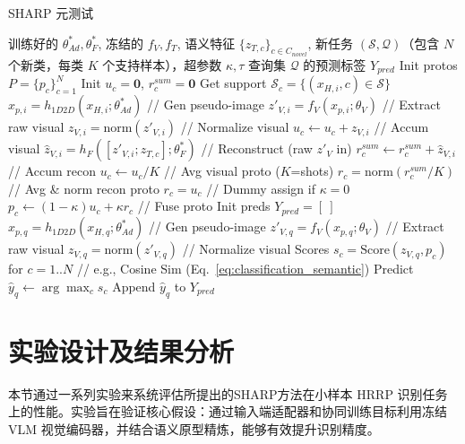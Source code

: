 \begin{algorithm}[htbp] 
\caption{SHARP 元测试} 
\label{alg:fsl_testing_sharp} 
\begin{algorithmic}[1] 
\REQUIRE 训练好的 $\theta_{Ad}^*, \theta_F^*$, 冻结的 $f_V, f_T$, 语义特征 $\{z_{T,c}\}_{c \in C_{novel}}$, 新任务 $(\mathcal{S}, \mathcal{Q})$（包含 $N$ 个新类，每类 $K$ 个支持样本），超参数 $\kappa, \tau$ \ENSURE 查询集 $\mathcal{Q}$ 的预测标签 $Y_{pred}$ 
\STATE Init protos $P = \{ p_c \}_{c=1}^N$
    \STATE Init $u_c=\mathbf{0}$, $r_c^{sum}=\mathbf{0}$
    \STATE Get support $\mathcal{S}_c = \{(x_{H,i}, c) \in \mathcal{S}\}$
        \STATE $x_{p,i} = h_{1D2D}(x_{H,i}; \theta_{Ad}^*)$ // Gen pseudo-image
        \STATE $z'_{V,i} = f_V(x_{p,i}; \theta_V)$          // Extract raw visual
        \STATE $z_{V,i} = \text{norm}(z'_{V,i})$           // Normalize visual
        \STATE $u_c \leftarrow u_c + z_{V,i}$             // Accum visual
            \STATE $\hat{z}_{V,i} = h_F([z'_{V,i}; z_{T,c}]; \theta_F^*)$ // Reconstruct (raw $z'_V$ in)
            \STATE $r_c^{sum} \leftarrow r_c^{sum} + \hat{z}_{V,i}$ // Accum recon
        \ENDIF
    \ENDFOR
    \STATE $u_c \leftarrow u_c / K$                     // Avg visual proto ($K$=shots)
        \STATE $r_c = \text{norm}(r_c^{sum} / K)$       // Avg \& norm recon proto
    \ELSE
        \STATE $r_c = u_c$                             // Dummy assign if $\kappa=0$
    \ENDIF
    \STATE $p_c \leftarrow (1 - \kappa) u_c + \kappa r_c$   // Fuse proto
\ENDFOR
\STATE Init preds $Y_{pred} = [~]$
    \STATE $x_{p,q} = h_{1D2D}(x_{H,q}; \theta_{Ad}^*)$  // Gen pseudo-image
    \STATE $z'_{V,q} = f_V(x_{p,q}; \theta_V)$           // Extract raw visual
    \STATE $z_{V,q} = \text{norm}(z'_{V,q})$            // Normalize visual
    \STATE Scores $s_c = \text{Score}(z_{V,q}, p_c)$ for $c=1..N$ // e.g., Cosine Sim (Eq.~\ref{eq:classification_semantic})
    \STATE Predict $\hat{y}_q \leftarrow \arg\max_{c} s_c$
    \STATE Append $\hat{y}_q$ to $Y_{pred}$
\ENDFOR
\end{algorithmic} 
\end{algorithm}

 \section{实验设计及结果分析} \label{sec:experiments_semantic} 本节通过一系列实验来系统评估所提出的SHARP方法在小样本 HRRP 识别任务上的性能。实验旨在验证核心假设：通过输入端适配器和协同训练目标利用冻结 VLM 视觉编码器，并结合语义原型精炼，能够有效提升识别精度。 
 
